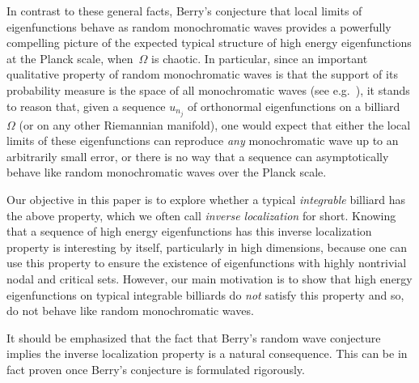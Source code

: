\documentclass{amsart}
\theoremstyle{definition}
\theoremstyle{remark}
\newcommand{\Om}{\Omega}
\numberwithin{equation}{section}
\theoremstyle{definition}
\theoremstyle{remark}
\begin{document}
In contrast to these general facts, Berry's conjecture that local limits of eigenfunctions behave as random monochromatic waves provides a powerfully compelling picture of the expected typical structure of high energy eigenfunctions at the Planck scale, when~$\Om$ is chaotic. In particular, since an important qualitative property of random monochromatic waves is that the support of its probability measure  is the space of all monochromatic waves (see e.g.~\cite[Lemma A.4]{NazarovSodin2016}), it stands to reason that, given a sequence $u_{n_j}$ of orthonormal eigenfunctions on a billiard~$\Om$ (or on any other Riemannian manifold), one would expect that {either} the local limits of these eigenfunctions can reproduce {\em any}\/ monochromatic wave up to an arbitrarily small error, or there is no way that a sequence can asymptotically behave like random monochromatic waves over the Planck scale. 

Our objective in this paper is to explore whether a typical {\em integrable}\/ billiard has the above property, which we often call {\em inverse localization}\/ for short. Knowing that a sequence of high energy eigenfunctions has this inverse localization property is interesting by itself, particularly in high dimensions, because one can use this property to ensure the existence of eigenfunctions with highly nontrivial nodal and critical sets. However, our main motivation is to show that high energy eigenfunctions on typical integrable billiards do {\em not}\/ satisfy this property and so, do not behave like random monochromatic waves. 

It should be emphasized that the fact that Berry's random wave conjecture implies the inverse localization property is a natural consequence. This can be in fact proven once Berry's conjecture is formulated rigorously.
\end{document}
